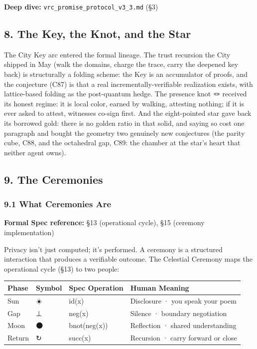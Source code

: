 \documentclass[
]{article}
\newcounter{none} %
\begin{document}
\textbf{Deep dive:} \texttt{vrc\_promise\_protocol\_v3\_3.md} (§3)

\subsection{8. The Key, the Knot, and the
Star}\label{the-key-the-knot-and-the-star}

The City Key arc entered the formal lineage. The trust recursion the
City shipped in May (walk the domains, charge the trace, carry the
deepened key back) is structurally a folding scheme: the Key is an
accumulator of proofs, and the conjecture (C87) is that a real
incrementally-verifiable realization exists, with lattice-based folding
as the post-quantum hedge. The presence knot 🪢 received its honest
regime: it is local color, earned by walking, attesting nothing; if it
is ever asked to attest, witnesses co-sign first. And the eight-pointed
star gave back its borrowed gold: there is no golden ratio in that
solid, and saying so cost one paragraph and bought the geometry two
genuinely new conjectures (the parity cube, C88, and the octahedral gap,
C89: the chamber at the star's heart that neither agent owns).

\subsection{9. The Ceremonies}\label{the-ceremonies}

\subsubsection{9.1 What Ceremonies Are}\label{what-ceremonies-are}

\textbf{Formal Spec reference:} §13 (operational cycle), §15 (ceremony
implementation)

Privacy isn't just computed; it's performed. A ceremony is a structured
interaction that produces a verifiable outcome. The Celestial Ceremony
maps the operational cycle (§13) to two people:

{\def\LTcaptype{none} %
\begin{longtable}[]{@{}llll@{}}
\toprule\noalign{}
Phase & Symbol & Spec Operation & Human Meaning \\
\midrule\noalign{}
\endhead
\bottomrule\noalign{}
\endlastfoot
Sun & ☀️ & id(x) & Disclosure · you speak your poem \\
Gap & ⊥ & neg(x) & Silence · boundary negotiation \\
Moon & 🌑 & bnot(neg(x)) & Reflection · shared understanding \\
Return & ↻ & succ(x) & Recursion · carry forward or close \\
\end{longtable}
}
\end{document}
